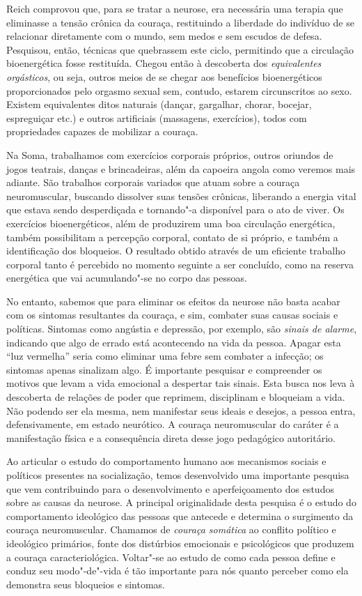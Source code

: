 Reich comprovou que, para se tratar a neurose, era necessária uma
terapia que eliminasse a tensão crônica da couraça, restituindo a
liberdade do indivíduo de se relacionar diretamente com o mundo, sem
medos e sem escudos de defesa. Pesquisou, então, técnicas que quebrassem
este ciclo, permitindo que a circulação bioenergética fosse restituída.
Chegou então à descoberta dos \emph{equivalentes orgásticos}, ou seja,
outros meios de se chegar aos benefícios bioenergéticos proporcionados
pelo orgasmo sexual sem, contudo, estarem circunscritos ao sexo. Existem
equivalentes ditos naturais (dançar, gargalhar, chorar, bocejar,
espreguiçar etc.) e outros artificiais (massagens, exercícios), todos
com propriedades capazes de mobilizar a couraça.

Na Soma, trabalhamos com exercícios corporais próprios, outros oriundos
de jogos teatrais, danças e brincadeiras, além da capoeira angola como
veremos mais adiante. São trabalhos corporais variados que atuam sobre a
couraça neuromuscular, buscando dissolver suas tensões crônicas,
liberando a energia vital que estava sendo desperdiçada e tornando"-a
disponível para o ato de viver. Os exercícios bioenergéticos, além de
produzirem uma boa circulação energética, também possibilitam a
percepção corporal, contato de si próprio, e também a identificação
dos bloqueios. O resultado obtido através de um eficiente trabalho
corporal tanto é percebido no momento seguinte a ser concluído, como na
reserva energética que vai acumulando"-se no corpo das pessoas.

No entanto, sabemos que para eliminar os efeitos da neurose não basta
acabar com os sintomas resultantes da couraça, e sim, combater suas
causas sociais e políticas. Sintomas como angústia e depressão, por
exemplo, são \emph{sinais de alarme}, indicando que algo de errado está
acontecendo na vida da pessoa. Apagar esta ``luz vermelha'' seria como
eliminar uma febre sem combater a infecção; os sintomas apenas sinalizam
algo. É importante pesquisar e compreender os motivos que levam a vida
emocional a despertar tais sinais. Esta busca nos leva à descoberta de
relações de poder que reprimem, disciplinam e bloqueiam a vida. Não
podendo ser ela mesma, nem manifestar seus ideais e desejos, a pessoa
entra, defensivamente, em estado neurótico. A couraça neuromuscular do
caráter é a manifestação física e a consequência direta desse jogo
pedagógico autoritário.

Ao articular o estudo do comportamento humano aos mecanismos sociais e
políticos presentes na socialização, temos desenvolvido uma importante
pesquisa que vem contribuindo para o desenvolvimento e aperfeiçoamento
dos estudos sobre as causas da neurose. A principal originalidade desta
pesquisa é o estudo do comportamento ideológico das pessoas que antecede
e determina o surgimento da couraça neuromuscular. Chamamos de
\emph{couraça somática} ao conflito político e ideológico primários,
fonte dos distúrbios emocionais e psicológicos que produzem a couraça
caracteriológica. Voltar"-se ao estudo de como cada pessoa define e
conduz seu modo"-de"-vida é tão importante para nós quanto perceber como
ela demonstra seus bloqueios e sintomas.

